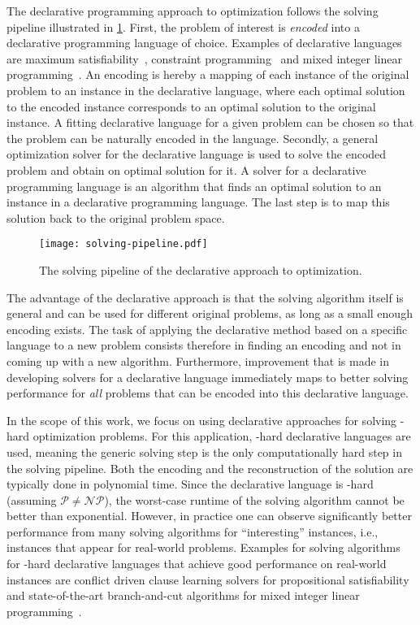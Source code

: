 The declarative programming approach to optimization follows the solving pipeline illustrated in \cref{fig:solving-pipeline}.
First, the problem of interest is \emph{encoded} into a declarative programming language of choice.
Examples of declarative languages are maximum satisfiability~\autocite{handbook2-maxsat}, constraint programming~\autocite{DBLP:reference/fai/2} and mixed integer linear programming~\autocites{ChenEtAl2010-intro,KorteVygen2018-5}.
An encoding is hereby a mapping of each instance of the original problem to an instance in the declarative language, where each optimal solution to the encoded instance corresponds to an optimal solution to the original instance.
A fitting declarative language for a given problem can be chosen so that the problem can be naturally encoded in the language.
Secondly, a general optimization solver for the declarative language is used to solve the encoded problem and obtain on optimal solution for it.
A solver for a declarative programming language is an algorithm that finds an optimal solution to an instance in a declarative programming language.
The last step is to map this solution back to the original problem space.

\begin{figure}
  \centering
  \texttt{[image: solving-pipeline.pdf]}
  \caption{The solving pipeline of the declarative approach to optimization.}\label{fig:solving-pipeline}
\end{figure}

The advantage of the declarative approach is that the solving algorithm itself is general and can be used for different original problems, as long as a small enough encoding exists.
The task of applying the declarative method based on a specific language to a new problem consists therefore in finding an encoding and not in coming up with a new algorithm.
Furthermore, improvement that is made in developing solvers for a declarative language immediately maps to better solving performance for \emph{all} problems that can be encoded into this declarative language.

In the scope of this work, we focus on using declarative approaches for solving \NP-hard optimization problems.
For this application, \NP-hard declarative languages are used, meaning the generic solving step is the only computationally hard step in the solving pipeline.
Both the encoding and the reconstruction of the solution are typically done in polynomial time.
Since the declarative language is \NP-hard (assuming $\mathcal{P}\neq\mathcal{NP}$), the worst-case runtime of the solving algorithm cannot be better than exponential.
However, in practice one can observe significantly better performance from many solving algorithms for ``interesting'' instances, i.e., instances that appear for real-world problems.
Examples for solving algorithms for \NP-hard declarative languages that achieve good performance on real-world instances are conflict driven clause learning solvers for propositional satisfiability~\autocite{handbook2-cdcl} and state-of-the-art branch-and-cut algorithms for mixed integer linear programming~\autocite{ChenEtAl2010-branch-and-cut}.


